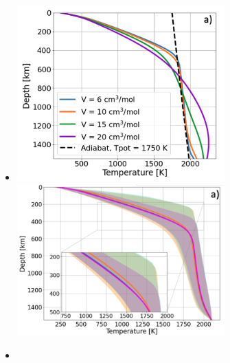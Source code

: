 \begin{itemize}
\item {}

\begin{center}
\includegraphics[width=8cm]{images/mars/temperature/plwk22b}
\includegraphics[width=8cm]{images/mars/temperature/plwk22e}
\end{center} 



\item {}


\end{itemize}
